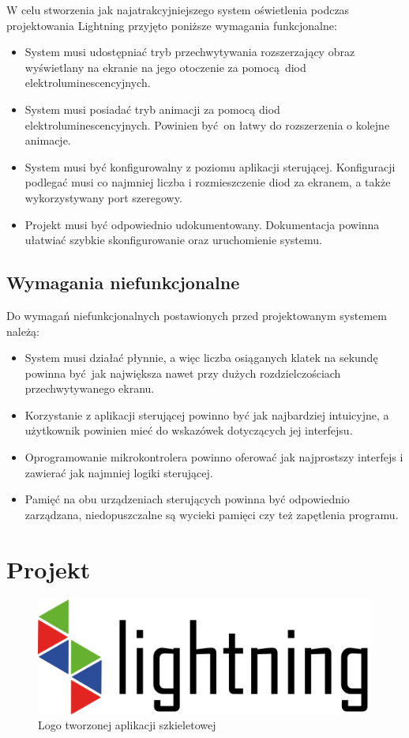 \documentclass[12pt]{report}
\begin{document}
W celu stworzenia jak najatrakcyjniejszego system oświetlenia podczas projektowania Lightning przyjęto poniższe wymagania funkcjonalne:

\begin{itemize}
\item System musi udostępniać tryb przechwytywania rozszerzający obraz wyświetlany na ekranie na jego otoczenie za pomocą diod elektroluminescencyjnych.
\item System musi posiadać tryb animacji za pomocą diod elektroluminescencyjnych. Powinien być on łatwy do rozszerzenia o kolejne animacje.
\item System musi być konfigurowalny z poziomu aplikacji sterującej. Konfiguracji podlegać musi co najmniej liczba i rozmieszczenie diod za ekranem, a także wykorzystywany port szeregowy.
\item Projekt musi być odpowiednio udokumentowany. Dokumentacja powinna ułatwiać szybkie skonfigurowanie oraz uruchomienie systemu.
\end{itemize}

\subsection{Wymagania niefunkcjonalne}

Do wymagań niefunkcjonalnych postawionych przed projektowanym systemem należą:

\begin{itemize}
\item System musi działać płynnie, a więc liczba osiąganych klatek na sekundę powinna być jak największa nawet przy dużych rozdzielczościach przechwytywanego ekranu.
\item Korzystanie z aplikacji sterującej powinno być jak najbardziej intuicyjne, a użytkownik powinien mieć do wskazówek dotyczących jej interfejsu.
\item Oprogramowanie mikrokontrolera powinno oferować jak najprostszy interfejs i zawierać jak najmniej logiki sterującej.
\item Pamięć na obu urządzeniach sterujących powinna być odpowiednio zarządzana, niedopuszczalne są wycieki pamięci czy też zapętlenia programu.
\end{itemize}

\section{Projekt}

\begin{figure}[h]
\centering
\includegraphics[width=.85\textwidth]{../resource/logo.png}
\caption{Logo tworzonej aplikacji szkieletowej}
\end{figure}
\end{document}
